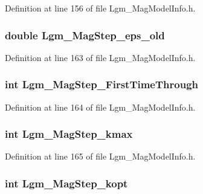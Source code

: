 Definition at line 156 of file Lgm\_\-MagModelInfo.h.\hypertarget{struct_lgm___mag_model_info_cbad03b970a668a0beb805a283fa01cf}{
\subsubsection[{Lgm\_\-MagStep\_\-eps\_\-old}]{\setlength{\rightskip}{0pt plus 5cm}double {\bf Lgm\_\-MagStep\_\-eps\_\-old}}}
\label{struct_lgm___mag_model_info_cbad03b970a668a0beb805a283fa01cf}




Definition at line 163 of file Lgm\_\-MagModelInfo.h.\hypertarget{struct_lgm___mag_model_info_fa214459195ced041bebfae2220e17c2}{
\subsubsection[{Lgm\_\-MagStep\_\-FirstTimeThrough}]{\setlength{\rightskip}{0pt plus 5cm}int {\bf Lgm\_\-MagStep\_\-FirstTimeThrough}}}
\label{struct_lgm___mag_model_info_fa214459195ced041bebfae2220e17c2}




Definition at line 164 of file Lgm\_\-MagModelInfo.h.\hypertarget{struct_lgm___mag_model_info_dbca9048683a6b46691f16bbc6badc91}{
\subsubsection[{Lgm\_\-MagStep\_\-kmax}]{\setlength{\rightskip}{0pt plus 5cm}int {\bf Lgm\_\-MagStep\_\-kmax}}}
\label{struct_lgm___mag_model_info_dbca9048683a6b46691f16bbc6badc91}




Definition at line 165 of file Lgm\_\-MagModelInfo.h.\hypertarget{struct_lgm___mag_model_info_9074ef2a6a61faf148f617fc02a8f9df}{
\subsubsection[{Lgm\_\-MagStep\_\-kopt}]{\setlength{\rightskip}{0pt plus 5cm}int {\bf Lgm\_\-MagStep\_\-kopt}}}
\label{struct_lgm___mag_model_info_9074ef2a6a61faf148f617fc02a8f9df}




